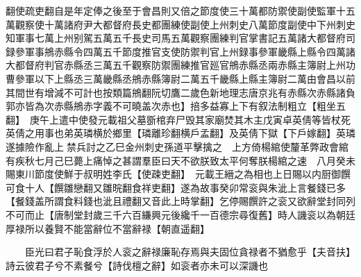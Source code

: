 翻使疏吏翻自是年定俸之後至于會昌則又倍之節度使三十萬都防禦使副使監軍十五萬觀察使十萬諸府尹大都督府長史都團練使副使上州刺史八萬節度副使中下州刺史知軍事七萬上州别駕五萬五千長史司馬五萬觀察團練判官掌書記五萬諸大都督府司録參軍事鴘赤縣令四萬五千節度推官支使防禦判官上州録事參軍畿縣上縣令四萬諸大都督府判官赤縣丞三萬五千觀察防禦團練推官廵官鴘赤縣丞兩赤縣主簿尉上州功曹參軍以下上縣丞三萬畿縣丞鴘赤縣簿尉二萬五千畿縣上縣主簿尉二萬由會昌以前其間世有增減不可計也按類篇鴘翻阮切鷹二歲色新地理志唐京兆有赤縣次赤縣諸負郭亦皆為次赤縣鴘赤字義不可曉盖次赤也】掊多益寡上下有叙法制粗立【粗坐五翻】　庚午上遣中使發元載祖父墓斵棺弃尸毁其家廟焚其木主戊寅卓英倩等皆杖死英倩之用事也弟英璘横於鄉里【璘離珍翻横戶孟翻】及英倩下獄【下戶嫁翻】英璘遂據險作亂上禁兵討之乙巳金州刺史孫道平擊擒之　上方倚楊綰使釐革弊政會綰有疾秋七月己巳薨上痛悼之甚謂羣臣曰天不欲朕致太平何奪朕楊綰之速　八月癸未賜東川節度使鮮于叔明姓李氏【使疎吏翻】　元載王縉之為相也上日賜以内厨御饌可食十人【饌雛戀翻又雛晥翻食祥吏翻】遂為故事癸卯常衮與朱泚上言餐錢已多【餐錢盖所謂食料錢也泚且禮翻又音此上時掌翻】乞停賜饌許之衮又欲辭堂封同列不可而止【唐制堂封歲三千六百縑興元後纔千一百德宗尋復舊】時人譏衮以為朝廷厚禄所以養賢不能當辭位不當辭禄【朝直遥翻】

　　臣光曰君子恥食浮於人衮之辭禄廉恥存焉與夫固位貪禄者不猶愈乎【夫音扶】詩云彼君子兮不素餐兮【詩伐檀之辭】如衮者亦未可以深譏也

